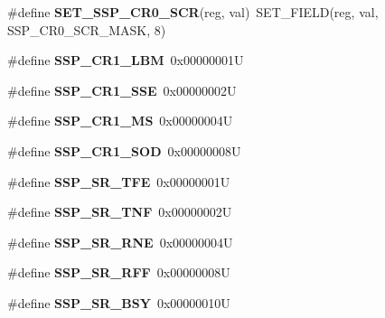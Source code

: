 \begin{DoxyCompactItemize}
\#define {\bfseries S\+E\+T\+\_\+\+S\+S\+P\+\_\+\+C\+R0\+\_\+\+S\+CR}(reg,  val)~S\+E\+T\+\_\+\+F\+I\+E\+LD(reg, val, S\+S\+P\+\_\+\+C\+R0\+\_\+\+S\+C\+R\+\_\+\+M\+A\+SK, 8)
\item 
\mbox{\label{group__lpc24xx__regs_gaa5b3207a9e4429a165a046040039bc89}} 
\#define {\bfseries S\+S\+P\+\_\+\+C\+R1\+\_\+\+L\+BM}~0x00000001U
\item 
\mbox{\label{group__lpc24xx__regs_ga43897f45d7220512e89eb184978f1d54}} 
\#define {\bfseries S\+S\+P\+\_\+\+C\+R1\+\_\+\+S\+SE}~0x00000002U
\item 
\mbox{\label{group__lpc24xx__regs_ga94760139cb786be5c761ee52ad67caee}} 
\#define {\bfseries S\+S\+P\+\_\+\+C\+R1\+\_\+\+MS}~0x00000004U
\item 
\mbox{\label{group__lpc24xx__regs_ga94449bd7948588da7fd099c2c8ec1ceb}} 
\#define {\bfseries S\+S\+P\+\_\+\+C\+R1\+\_\+\+S\+OD}~0x00000008U
\item 
\mbox{\label{group__lpc24xx__regs_gaa56cadbf2604cf3d9706f3583be99f63}} 
\#define {\bfseries S\+S\+P\+\_\+\+S\+R\+\_\+\+T\+FE}~0x00000001U
\item 
\mbox{\label{group__lpc24xx__regs_gabde0199183f2a747cd039c66d40cf534}} 
\#define {\bfseries S\+S\+P\+\_\+\+S\+R\+\_\+\+T\+NF}~0x00000002U
\item 
\mbox{\label{group__lpc24xx__regs_ga67740be98d73a50bf341ca3e2c25da6e}} 
\#define {\bfseries S\+S\+P\+\_\+\+S\+R\+\_\+\+R\+NE}~0x00000004U
\item 
\mbox{\label{group__lpc24xx__regs_gacb3442f8b9ec2dbb3be63f154cc58940}} 
\#define {\bfseries S\+S\+P\+\_\+\+S\+R\+\_\+\+R\+FF}~0x00000008U
\item 
\mbox{\label{group__lpc24xx__regs_gac57c889d98458cfbde35f0ab63b499c2}} 
\#define {\bfseries S\+S\+P\+\_\+\+S\+R\+\_\+\+B\+SY}~0x00000010U
\item 
\mbox{\label{group__lpc24xx__regs_ga785281a2af5aafe652c647c580aa44cd}} 

\end{DoxyCompactItemize}
